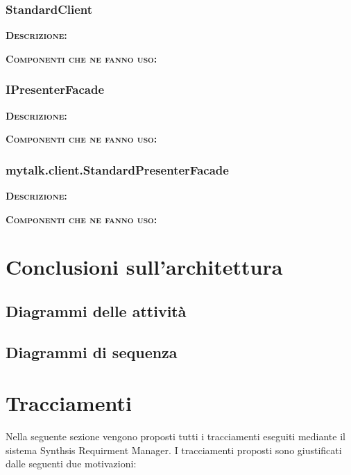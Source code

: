 \subsubsection{StandardClient}
\begin{description}
	\item{\scshape\bfseries Descrizione:} 
	\item{\scshape\bfseries Componenti che ne fanno uso:} 
\end{description}

\subsubsection{IPresenterFacade}
\begin{description}
	\item{\scshape\bfseries Descrizione:} 
	\item{\scshape\bfseries Componenti che ne fanno uso:} 
\end{description}

\subsubsection{mytalk.client.StandardPresenterFacade}
\begin{description}
	\item{\scshape\bfseries Descrizione:} 
	\item{\scshape\bfseries Componenti che ne fanno uso:} 
\end{description}
\clearpage

\section{Conclusioni sull'architettura}

\subsection{Diagrammi delle attività}

\subsection{Diagrammi di sequenza}
\clearpage

\section{Tracciamenti}
Nella seguente sezione vengono proposti tutti i tracciamenti eseguiti mediante il sistema Synthsis Requirment Manager. I tracciamenti proposti sono giustificati dalle seguenti due motivazioni:

